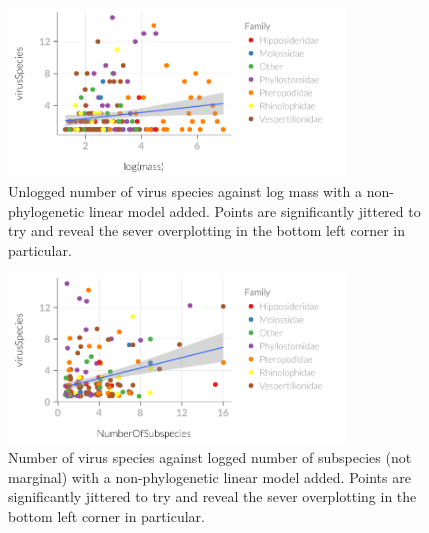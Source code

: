 \begin{knitrout}\footnotesize
{}\color{fgcolor}\begin{figure}[t]

{\centering \includegraphics[width=0.8\textwidth]{figure/subsDataviz-1} 

}

\caption[Unlogged number of virus species against log mass with a non-phylogenetic linear model added]{Unlogged number of virus species against log mass with a non-phylogenetic linear model added. Points are significantly jittered to try and reveal the sever overplotting in the bottom left corner in particular.}\label{fig:subsDataviz}
\end{figure}

\begin{figure}[t]

{\centering \includegraphics[width=0.8\textwidth]{figure/subsDataviz-2} 

}

\caption[Number of virus species against logged number of subspecies (not marginal) with a non-phylogenetic linear model added]{Number of virus species against logged number of subspecies (not marginal) with a non-phylogenetic linear model added. Points are significantly jittered to try and reveal the sever overplotting in the bottom left corner in particular.}\label{fig:subsDataviz}
\end{figure}


\end{knitrout}
